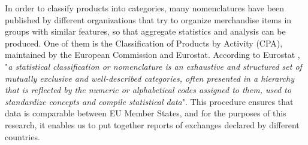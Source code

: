 In order to classify products into categories, many nomenclatures have been published by different organizations that try to organize merchandise items in groups with similar features, so that aggregate statistics and analysis can be produced. One of them is the Classification of Products by Activity (CPA), maintained by the European Commission and Eurostat.
According to Eurostat \cite{eurostat2022website}, "\textit{a statistical classification or nomenclature is an exhaustive and structured set of mutually exclusive and well-described categories, often presented in a hierarchy that is reflected by the numeric or alphabetical codes assigned to them, used to standardize concepts and compile statistical data}".
This procedure ensures that data is comparable between EU Member States, and for the purposes of this research, it enables us to put together reports of exchanges declared by different countries.


